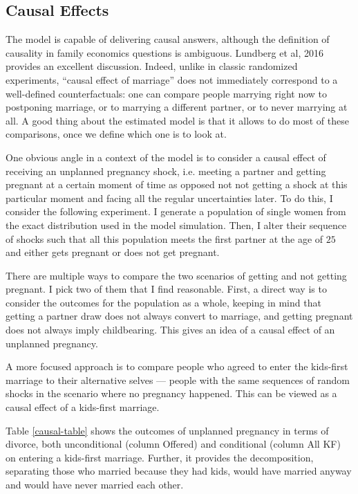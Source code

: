 \documentclass[12pt,letter]{article}
\begin{document}
\subsection{Causal Effects\label{causal-section}}

The model is capable of delivering causal answers, although the definition of causality in family economics questions is ambiguous. Lundberg et al, 2016\nocite{lundberg2016family} provides an excellent discussion. Indeed, unlike in classic randomized experiments, ``causal effect of marriage'' does not immediately correspond to a well-defined counterfactuals: one can compare people marrying right now to postponing marriage, or to marrying a different partner, or to never marrying at all. A good thing about the estimated model is that it allows to do most of these comparisons, once we define which one is to look at.

One obvious angle in a context of the model is to consider a causal effect of receiving an unplanned pregnancy shock, i.e. meeting a partner and getting pregnant at a certain moment of time as opposed not not getting a shock at this particular moment and facing all the regular uncertainties later. To do this, I consider the following experiment. I generate a population of single women from the exact distribution used in the model simulation. Then, I alter their sequence of shocks such that all this population meets the first partner at the age of $25$ and either gets pregnant  or does not get pregnant.

There are multiple ways to compare the two scenarios of getting and not getting pregnant. I pick two of them that I find reasonable. First, a direct way is to consider the outcomes for the population as a whole, keeping in mind that getting a partner draw does not always convert to marriage, and getting pregnant does not always imply childbearing. This gives an idea of a causal effect of an unplanned pregnancy.

A more focused approach is to compare people who agreed to enter the kids-first marriage to their alternative selves --- people with the same sequences of random shocks in the scenario where no pregnancy happened.  This can be viewed as a causal effect of a kids-first marriage.

Table \ref{causal-table} shows the outcomes of unplanned pregnancy in terms of divorce, both unconditional (column Offered) and conditional (column All KF) on entering a kids-first marriage. Further, it provides the decomposition, separating those who married because they had kids, would have married anyway and would have never married each other. 
\end{document}
